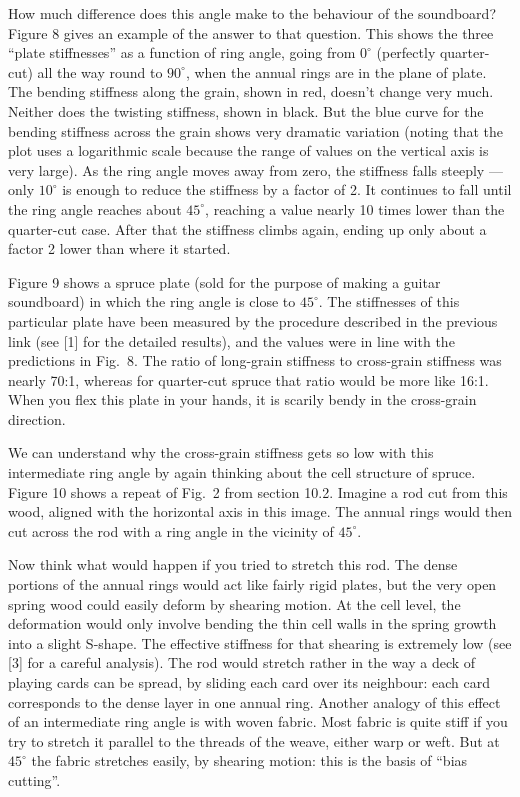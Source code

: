   How much difference does this angle make to the behaviour of the soundboard? 
  Figure 8 gives an example of the answer to that question. This shows the 
  three “plate stiffnesses” as a function of ring angle, going from $0^\circ$ 
  (perfectly quarter-cut) all the way round to $90^\circ$, when the annual 
  rings are in the plane of plate. The bending stiffness along the grain, shown 
  in red, doesn’t change very much. Neither does the twisting stiffness, shown 
  in black. But the blue curve for the bending stiffness across the grain shows 
  very dramatic variation (noting that the plot uses a logarithmic scale 
  because the range of values on the vertical axis is very large). As the ring 
  angle moves away from zero, the stiffness falls steeply — only $10^\circ$ is 
  enough to reduce the stiffness by a factor of 2. It continues to fall until 
  the ring angle reaches about $45^\circ$, reaching a value nearly 10 times 
  lower than the quarter-cut case. After that the stiffness climbs again, 
  ending up only about a factor 2 lower than where it started. 

  Figure 9 shows a spruce plate (sold for the purpose of making a guitar 
  soundboard) in which the ring angle is close to $45^\circ$. The stiffnesses 
  of this particular plate have been measured by the procedure described in the 
  previous link (see [1] for the detailed results), and the values were in line 
  with the predictions in Fig.\ 8. The ratio of long-grain stiffness to 
  cross-grain stiffness was nearly 70:1, whereas for quarter-cut spruce that 
  ratio would be more like 16:1. When you flex this plate in your hands, it is 
  scarily bendy in the cross-grain direction. 

  We can understand why the cross-grain stiffness gets so low with this 
  intermediate ring angle by again thinking about the cell structure of spruce. 
  Figure 10 shows a repeat of Fig.\ 2 from section 10.2. Imagine a rod cut from 
  this wood, aligned with the horizontal axis in this image. The annual rings 
  would then cut across the rod with a ring angle in the vicinity of 
  $45^\circ$. 

  Now think what would happen if you tried to stretch this rod. The dense 
  portions of the annual rings would act like fairly rigid plates, but the very 
  open spring wood could easily deform by shearing motion. At the cell level, 
  the deformation would only involve bending the thin cell walls in the spring 
  growth into a slight S-shape. The effective stiffness for that shearing is 
  extremely low (see [3] for a careful analysis). The rod would stretch rather 
  in the way a deck of playing cards can be spread, by sliding each card over 
  its neighbour: each card corresponds to the dense layer in one annual ring. 
  Another analogy of this effect of an intermediate ring angle is with woven 
  fabric. Most fabric is quite stiff if you try to stretch it parallel to the 
  threads of the weave, either warp or weft. But at $45^\circ$ the fabric 
  stretches easily, by shearing motion: this is the basis of ``bias cutting''. 


